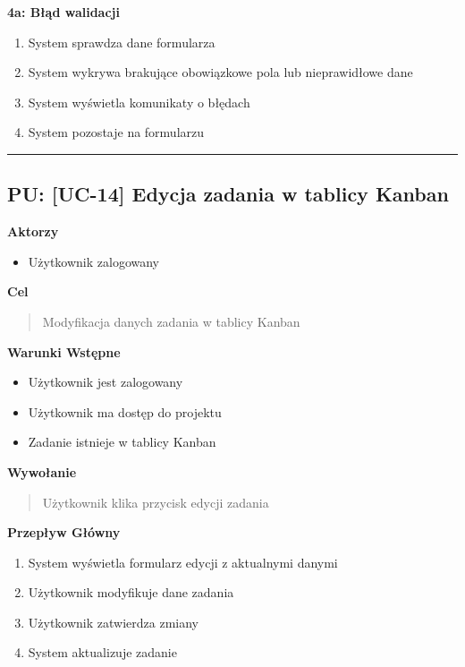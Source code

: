\textbf{4a: Błąd walidacji}
\begin{enumerate}
    \item System sprawdza dane formularza
    \item System wykrywa brakujące obowiązkowe pola lub nieprawidłowe dane
    \item System wyświetla komunikaty o błędach
    \item System pozostaje na formularzu
\end{enumerate}


\hrule
\vspace{1cm}

\subsection*{PU: [UC-14] Edycja zadania w tablicy Kanban}

\noindent\textbf{Aktorzy}
\begin{itemize}
    \item Użytkownik zalogowany
\end{itemize}

\vspace{0.2cm}
\noindent\textbf{Cel}
\begin{quote}
    Modyfikacja danych zadania w tablicy Kanban
\end{quote}

\vspace{0.2cm}
\noindent\textbf{Warunki Wstępne}
\begin{itemize}
    \item Użytkownik jest zalogowany
    \item Użytkownik ma dostęp do projektu
    \item Zadanie istnieje w tablicy Kanban
\end{itemize}

\vspace{0.2cm}
\noindent\textbf{Wywołanie}
\begin{quote}
    Użytkownik klika przycisk edycji zadania
\end{quote}

\vspace{0.2cm}
\noindent\textbf{Przepływ Główny}
\begin{enumerate}
    \item System wyświetla formularz edycji z aktualnymi danymi
    \item Użytkownik modyfikuje dane zadania
    \item Użytkownik zatwierdza zmiany
    \item System aktualizuje zadanie
\end{enumerate}

